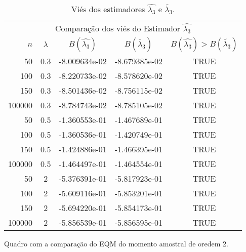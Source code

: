 \documentclass[12pt]{article}
\begin{document}
\begin{table}[H]
\caption{Viés dos estimadores $\hat{\lambda_{3}}$ e $\tilde{\lambda_{3}}$.}
\label{tab:p1Vies}
\centering
\begin{tabular}{rcccc}
\toprule
\multicolumn{5}{c}{Comparação dos viés do Estimador $\hat{\lambda_{3}}$}\\
$n$ & $\lambda$ & $B(\hat{\lambda_{3}})$ & $B(\tilde{\lambda_{3}})$ & $B(\hat{\lambda_{3}})>B(\tilde{\lambda_{3}})$ \\
\midrule
50 & 0.3 & -8.009634e-02 & -8.679385e-02  & TRUE \\
100 & 0.3 & -8.220733e-02 & -8.578620e-02 & TRUE \\
150 & 0.3 & -8.501436e-02 & -8.756115e-02 & TRUE \\
100000 & 0.3 & -8.784743e-02 & -8.785105e-02 & TRUE \\
\midrule
50 & 0.5 & -1.360553e-01 & -1.467689e-01  & TRUE \\
100 & 0.5 &  -1.360536e-01 & -1.420749e-01 & TRUE \\
150 & 0.5 &  -1.424886e-01  & -1.466395e-01 & TRUE\\
100000 & 0.5 & -1.464497e-01 & -1.464554e-01 & TRUE \\
\midrule
50 & 2 & -5.376391e-01 &  -5.817923e-01 & TRUE \\
100 & 2 & -5.609116e-01 & -5.853201e-01 & TRUE \\
150 & 2 & -5.694220e-01 & -5.854173e-01 & TRUE \\
100000 & 2 & -5.856539e-01 & -5.856595e-01 & TRUE \\
\bottomrule
\end{tabular}
\end{table}

Quadro com a comparação do EQM do momento amostral de oredem 2.
\end{document}
